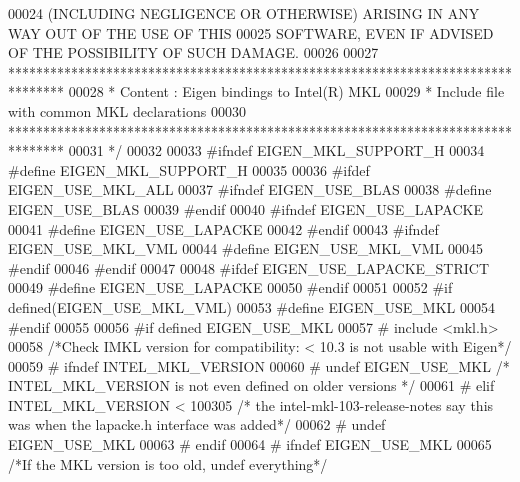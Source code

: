 \begin{DoxyCode}
00024 \textcolor{comment}{ (INCLUDING NEGLIGENCE OR OTHERWISE) ARISING IN ANY WAY OUT OF THE USE OF THIS}
00025 \textcolor{comment}{ SOFTWARE, EVEN IF ADVISED OF THE POSSIBILITY OF SUCH DAMAGE.}
00026 \textcolor{comment}{}
00027 \textcolor{comment}{ ********************************************************************************}
00028 \textcolor{comment}{ *   Content : Eigen bindings to Intel(R) MKL}
00029 \textcolor{comment}{ *   Include file with common MKL declarations}
00030 \textcolor{comment}{ ********************************************************************************}
00031 \textcolor{comment}{*/}
00032 
00033 \textcolor{preprocessor}{#ifndef EIGEN\_MKL\_SUPPORT\_H}
00034 \textcolor{preprocessor}{#define EIGEN\_MKL\_SUPPORT\_H}
00035 
00036 \textcolor{preprocessor}{#ifdef EIGEN\_USE\_MKL\_ALL}
00037 \textcolor{preprocessor}{  #ifndef EIGEN\_USE\_BLAS}
00038 \textcolor{preprocessor}{    #define EIGEN\_USE\_BLAS}
00039 \textcolor{preprocessor}{  #endif}
00040 \textcolor{preprocessor}{  #ifndef EIGEN\_USE\_LAPACKE}
00041 \textcolor{preprocessor}{    #define EIGEN\_USE\_LAPACKE}
00042 \textcolor{preprocessor}{  #endif}
00043 \textcolor{preprocessor}{  #ifndef EIGEN\_USE\_MKL\_VML}
00044 \textcolor{preprocessor}{    #define EIGEN\_USE\_MKL\_VML}
00045 \textcolor{preprocessor}{  #endif}
00046 \textcolor{preprocessor}{#endif}
00047 
00048 \textcolor{preprocessor}{#ifdef EIGEN\_USE\_LAPACKE\_STRICT}
00049 \textcolor{preprocessor}{  #define EIGEN\_USE\_LAPACKE}
00050 \textcolor{preprocessor}{#endif}
00051 
00052 \textcolor{preprocessor}{#if defined(EIGEN\_USE\_MKL\_VML)}
00053 \textcolor{preprocessor}{  #define EIGEN\_USE\_MKL}
00054 \textcolor{preprocessor}{#endif}
00055 
00056 \textcolor{preprocessor}{#if defined EIGEN\_USE\_MKL}
00057 \textcolor{preprocessor}{#   include <mkl.h>} 
00058 \textcolor{comment}{/*Check IMKL version for compatibility: < 10.3 is not usable with Eigen*/}
00059 \textcolor{preprocessor}{#   ifndef INTEL\_MKL\_VERSION}
00060 \textcolor{preprocessor}{#       undef EIGEN\_USE\_MKL }\textcolor{comment}{/* INTEL\_MKL\_VERSION is not even defined on older versions */}\textcolor{preprocessor}{}
00061 \textcolor{preprocessor}{#   elif INTEL\_MKL\_VERSION < 100305    }\textcolor{comment}{/* the intel-mkl-103-release-notes say this was when the lapacke.h
       interface was added*/}\textcolor{preprocessor}{}
00062 \textcolor{preprocessor}{#       undef EIGEN\_USE\_MKL}
00063 \textcolor{preprocessor}{#   endif}
00064 \textcolor{preprocessor}{#   ifndef EIGEN\_USE\_MKL}
00065     \textcolor{comment}{/*If the MKL version is too old, undef everything*/}

\end{DoxyCode}
